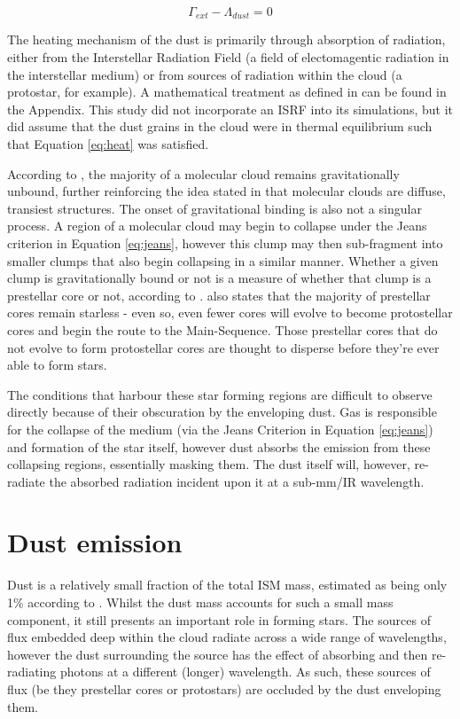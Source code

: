 \documentclass{report}
\begin{document}
\begin{equation}
  \Gamma_{ext} - \Lambda_{dust} = 0
\end{equation} \label{eq:heat}

The heating mechanism of the dust is primarily through absorption of radiation, either from the Interstellar Radiation Field (a field of electomagentic radiation in the interstellar medium) or from sources of radiation within the cloud (a protostar, for example). A mathematical treatment as defined in \textcite{treecol} can be found in the Appendix. This study did not incorporate an ISRF into its simulations, but it did assume that the dust grains in the cloud were in thermal equilibrium such that Equation \ref{eq:heat} was satisfied.

According to \textcite{bound}, the majority of a molecular cloud remains gravitationally unbound, further reinforcing the idea stated in \textcite{evo-mol} that molecular clouds are diffuse, transiest structures. The onset of gravitational binding is also not a singular process. A region of a molecular cloud may begin to collapse under the Jeans criterion in Equation \ref{eq:jeans}, however this clump may then sub-fragment into smaller clumps that also begin collapsing in a similar manner. Whether a given clump is gravitationally bound or not is a measure of whether that clump is a prestellar core or not, according to \textcite{prestellar}. \textcite{prestellar} also states that the majority of prestellar cores remain starless - even so, even fewer cores will evolve to become protostellar cores and begin the route to the Main-Sequence. Those prestellar cores that do not evolve to form protostellar cores are thought to disperse before they're ever able to form stars.

The conditions that harbour these star forming regions are difficult to observe directly because of their obscuration by the enveloping dust. Gas is responsible for the collapse of the medium (via the Jeans Criterion in Equation \ref{eq:jeans}) and formation of the star itself, however dust absorbs the emission from these collapsing regions, essentially masking them. The dust itself will, however, re-radiate the absorbed radiation incident upon it at a sub-mm/IR wavelength.

\section{Dust emission}
Dust is a relatively small fraction of the total ISM mass, estimated as being only 1\% according to \textcite{noise}. Whilst the dust mass accounts for such a small mass component, it still presents an important role in forming stars. The sources of flux embedded deep within the cloud radiate across a wide range of wavelengths, however the dust surrounding the source has the effect of absorbing and then re-radiating photons at a different (longer) wavelength. As such, these sources of flux (be they prestellar cores or protostars) are occluded by the dust enveloping them.
\end{document}
